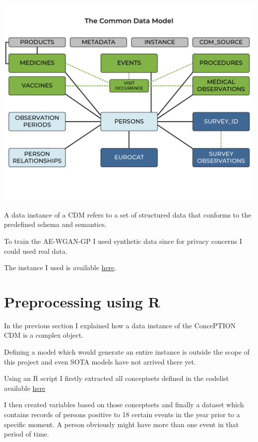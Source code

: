\documentclass[
  letterpaper,
  DIV=11,
  numbers=noendperiod]{scrreprt}
\begin{document}
\includegraphics{Common Data Model.png}

A data instance of a CDM refers to a set of structured data that
conforms to the predefined schema and semantics.

To train the AE-WGAN-GP I used synthetic data since for privacy concerns
I could used real data.

The instance I used is available
\href{https://github.com/dado330/AE-WGAN-GP/tree/main/R_preprocessing/i_input_subpop}{here}.

\hypertarget{preprocessing-using-r}{%
\chapter{Preprocessing using R}\label{preprocessing-using-r}}

In the previous section I explained how a data instance of the
ConcePTION CDM is a complex object.

Defining a model which would generate an entire instance is outside the
scope of this project and even SOTA models have not arrived there yet.

Using an R script I firstly extracted all conceptsets defined in the
codelist available
\href{https://github.com/dado330/AE-WGAN-GP/blob/main/R_preprocessing/p_parameters/archive_parameters/20231127_V2_full_codelist_at_20231127.csv}{here}

I then created variables based on those conceptsets and finally a
dataset which contains records of persons positive to 18 certain events
in the year prior to a specific moment. A person obviously might have
more than one event in that period of time.
\end{document}
